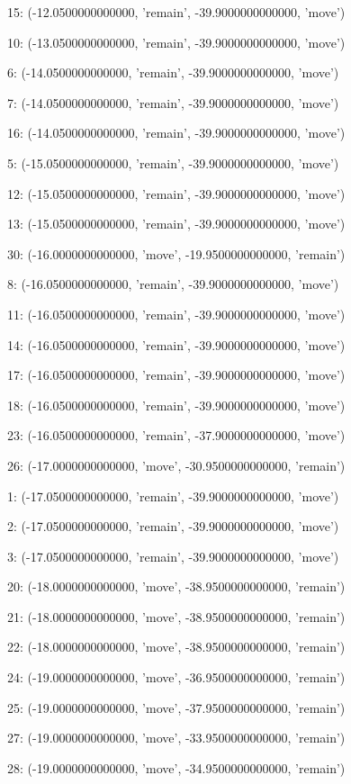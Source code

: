 15: (-12.0500000000000, 'remain', -39.9000000000000, 'move')


10: (-13.0500000000000, 'remain', -39.9000000000000, 'move')


6: (-14.0500000000000, 'remain', -39.9000000000000, 'move')


7: (-14.0500000000000, 'remain', -39.9000000000000, 'move')


16: (-14.0500000000000, 'remain', -39.9000000000000, 'move')


5: (-15.0500000000000, 'remain', -39.9000000000000, 'move')


12: (-15.0500000000000, 'remain', -39.9000000000000, 'move')


13: (-15.0500000000000, 'remain', -39.9000000000000, 'move')


30: (-16.0000000000000, 'move', -19.9500000000000, 'remain')


8: (-16.0500000000000, 'remain', -39.9000000000000, 'move')


11: (-16.0500000000000, 'remain', -39.9000000000000, 'move')


14: (-16.0500000000000, 'remain', -39.9000000000000, 'move')


17: (-16.0500000000000, 'remain', -39.9000000000000, 'move')


18: (-16.0500000000000, 'remain', -39.9000000000000, 'move')


23: (-16.0500000000000, 'remain', -37.9000000000000, 'move')


26: (-17.0000000000000, 'move', -30.9500000000000, 'remain')


1: (-17.0500000000000, 'remain', -39.9000000000000, 'move')


2: (-17.0500000000000, 'remain', -39.9000000000000, 'move')


3: (-17.0500000000000, 'remain', -39.9000000000000, 'move')


20: (-18.0000000000000, 'move', -38.9500000000000, 'remain')


21: (-18.0000000000000, 'move', -38.9500000000000, 'remain')


22: (-18.0000000000000, 'move', -38.9500000000000, 'remain')


24: (-19.0000000000000, 'move', -36.9500000000000, 'remain')


25: (-19.0000000000000, 'move', -37.9500000000000, 'remain')


27: (-19.0000000000000, 'move', -33.9500000000000, 'remain')


28: (-19.0000000000000, 'move', -34.9500000000000, 'remain')


